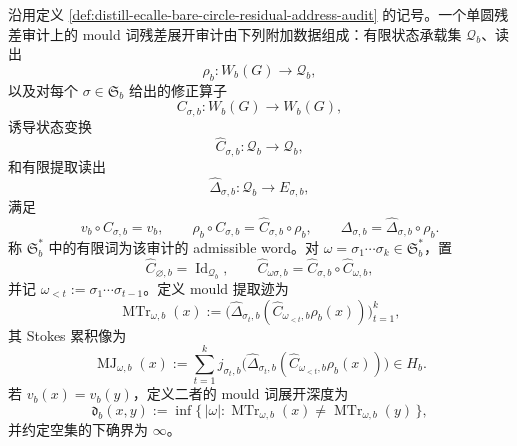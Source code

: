 \begin{definition}\label{distill:ecalle_resurgence_mould_calculus_and_alien_derivatives-mould_indexed_time_depth_chain-bare-circle-mould-word-audit}
沿用定义 \ref{def:distill-ecalle-bare-circle-residual-address-audit} 的记号。一个单圆残差审计上的 mould 词残差展开审计由下列附加数据组成：有限状态承载集 \(\mathcal Q_b\)、读出
\[
\rho_b:W_b(G)\to\mathcal Q_b,
\]
以及对每个 \(\sigma\in\mathfrak S_b\) 给出的修正算子
\[
C_{\sigma,b}:W_b(G)\to W_b(G),
\]
诱导状态变换
\[
\widehat C_{\sigma,b}:\mathcal Q_b\to\mathcal Q_b,
\]
和有限提取读出
\[
\widehat\Delta_{\sigma,b}:\mathcal Q_b\to E_{\sigma,b},
\]
满足
\[
v_b\circ C_{\sigma,b}=v_b,\qquad
\rho_b\circ C_{\sigma,b}=\widehat C_{\sigma,b}\circ\rho_b,\qquad
\Delta_{\sigma,b}=\widehat\Delta_{\sigma,b}\circ\rho_b.
\]
称 \(\mathfrak S_b^*\) 中的有限词为该审计的 admissible word。对
\(\omega=\sigma_1\cdots\sigma_k\in\mathfrak S_b^*\)，置
\[
\widehat C_{\varnothing,b}=\operatorname{Id}_{\mathcal Q_b},\qquad
\widehat C_{\omega\sigma,b}=\widehat C_{\sigma,b}\circ\widehat C_{\omega,b},
\]
并记 \(\omega_{<t}:=\sigma_1\cdots\sigma_{t-1}\)。定义 mould 提取迹为
\[
\operatorname{MTr}_{\omega,b}(x):=
\bigl(\widehat\Delta_{\sigma_t,b}(\widehat C_{\omega_{<t},b}\rho_b(x))\bigr)_{t=1}^{k},
\]
其 Stokes 累积像为
\[
\operatorname{MJ}_{\omega,b}(x):=
\sum_{t=1}^{k}j_{\sigma_t,b}\bigl(\widehat\Delta_{\sigma_t,b}(\widehat C_{\omega_{<t},b}\rho_b(x))\bigr)\in H_b.
\]
若 \(v_b(x)=v_b(y)\)，定义二者的 mould 词展开深度为
\[
\mathfrak d_b(x,y):=\inf\{\,|\omega|:\operatorname{MTr}_{\omega,b}(x)\ne
\operatorname{MTr}_{\omega,b}(y)\,\},
\]
并约定空集的下确界为 \(\infty\)。
\end{definition}

